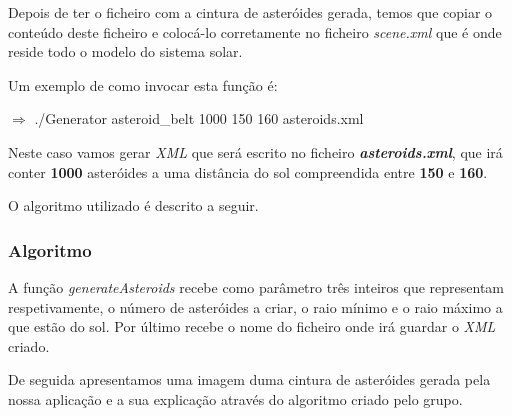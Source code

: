 \documentclass[a4paper]{article}
\begin{document}
Depois de ter o ficheiro com a cintura de asteróides gerada, temos que copiar o conteúdo deste ficheiro e colocá-lo corretamente no ficheiro \emph{scene.xml} que é onde reside todo o modelo do sistema solar.

Um exemplo de como invocar esta função é:

 \vspace{0.5cm}

$\Rightarrow$ ./Generator asteroid\_belt 1000 150 160 asteroids.xml

 \vspace{0.5cm}

 Neste caso vamos gerar \emph{XML} que será escrito no ficheiro \textbf{\emph{asteroids.xml}}, que irá conter \textbf{1000} asteróides a uma distância do sol compreendida entre \textbf{150} e \textbf{160}.

O algoritmo utilizado é descrito a seguir.

\subsubsection{Algoritmo}
A função \textit{generateAsteroids} recebe como parâmetro três inteiros que representam respetivamente, o número de asteróides a criar, o raio mínimo e o raio máximo a que estão do sol. Por último recebe o nome do ficheiro onde irá guardar o \emph{XML} criado.

De seguida apresentamos uma imagem duma cintura de asteróides gerada pela nossa aplicação e a sua explicação através do algoritmo criado pelo grupo.
\end{document}
